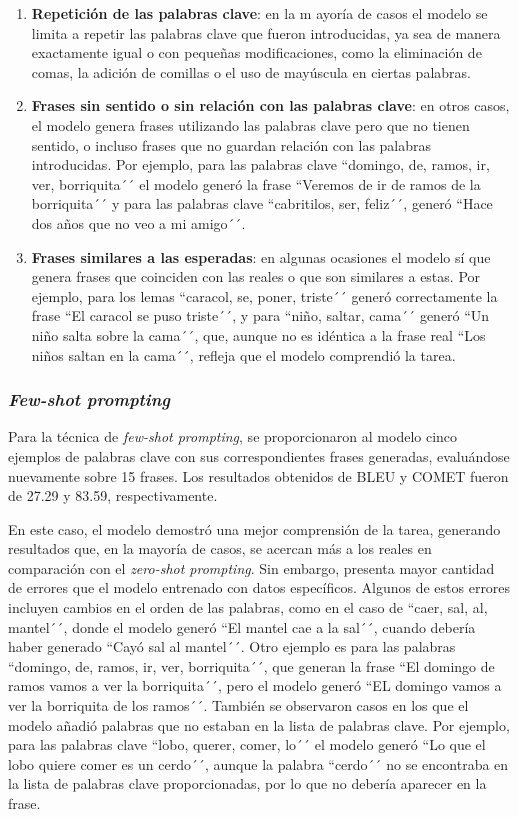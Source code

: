 \documentclass[11pt,spanish,listoffigures,listoftables]{tfgetsinf}
\begin{document}
\begin{enumerate}
	\item \textbf{Repetición de las palabras clave}: en la m ayoría de casos el modelo se limita a repetir las palabras clave que fueron introducidas, ya sea de manera exactamente igual o con pequeñas modificaciones, como la eliminación de comas, la adición de comillas o el uso de mayúscula en ciertas palabras.
	\item \textbf{Frases sin sentido o sin relación con las palabras clave}: en otros casos, el modelo genera frases utilizando las palabras clave pero que no tienen sentido, o incluso frases que no guardan relación con las palabras introducidas. Por ejemplo, para las palabras clave ``domingo, de, ramos, ir, ver, borriquita´´ el modelo generó la frase ``Veremos de ir de ramos de la borriquita´´ y para las palabras clave ``cabritilos, ser, feliz´´, generó ``Hace dos años que no veo a mi amigo´´. 
	\item \textbf{Frases similares a las esperadas}: en algunas ocasiones el modelo sí que genera frases que coinciden con las reales o que son similares a estas. Por ejemplo, para los lemas ``caracol, se, poner, triste´´ generó correctamente la frase ``El caracol se puso triste´´, y para  ``niño, saltar, cama´´ generó ``Un niño salta sobre la cama´´, que, aunque no es idéntica a la frase real ``Los niños saltan en la cama´´, refleja que el modelo comprendió la tarea.
\end{enumerate}

\subsubsection{\textit{Few-shot prompting}}

Para la técnica de \textit{few-shot prompting}, se proporcionaron al modelo cinco ejemplos de palabras clave con sus correspondientes frases generadas, evaluándose nuevamente sobre 15 frases. Los resultados obtenidos de BLEU y COMET fueron de 27.29 y 83.59, respectivamente.

En este caso, el modelo demostró una mejor comprensión de la tarea, generando resultados que, en la mayoría de casos, se acercan más a los reales en comparación con el  \textit{zero-shot prompting}. Sin embargo, presenta mayor cantidad de errores que el modelo entrenado con datos específicos. Algunos de estos errores incluyen cambios en el orden de las palabras, como en el caso de ``caer, sal, al, mantel´´, donde el modelo generó ``El mantel cae a la sal´´, cuando debería haber generado ``Cayó sal al mantel´´. Otro ejemplo es para las palabras ``domingo, de, ramos, ir, ver, borriquita´´, que generan la frase ``El domingo de ramos vamos a ver la borriquita´´, pero el modelo generó ``EL domingo vamos a ver la borriquita de los ramos´´. También se observaron casos en los que el modelo añadió palabras que no estaban en la lista de palabras clave. Por ejemplo, para las palabras clave ``lobo, querer, comer, lo´´ el modelo generó ``Lo que el lobo quiere comer es un cerdo´´, aunque la palabra ``cerdo´´ no se encontraba en la lista de palabras clave proporcionadas, por lo que no debería aparecer en la frase.
\end{document}
